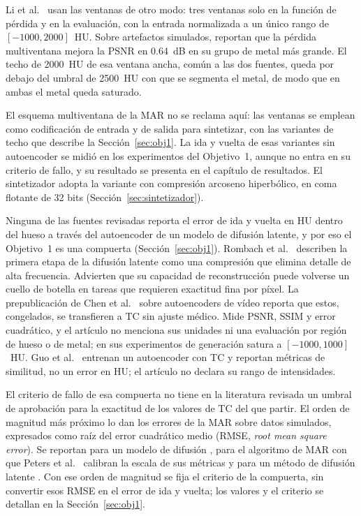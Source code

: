 Li et al.~\cite{li2024} usan las ventanas de otro modo: tres ventanas solo en la función de pérdida y en la evaluación, con la entrada normalizada a un único rango de $[-1000, 2000]$~HU. Sobre artefactos simulados, reportan que la pérdida multiventana mejora la PSNR en 0.64~dB en su grupo de metal más grande. El techo de 2000~HU de esa ventana ancha, común a las dos fuentes, queda por debajo del umbral de 2500~HU con que se segmenta el metal, de modo que en ambas el metal queda saturado.

El esquema multiventana de la MAR no se reclama aquí: las ventanas se emplean como codificación de entrada y de salida para sintetizar, con las variantes de techo que describe la Sección~\ref{sec:obj1}. La ida y vuelta de esas variantes sin autoencoder se midió en los experimentos del Objetivo~1, aunque no entra en su criterio de fallo, y su resultado se presenta en el capítulo de resultados. El sintetizador adopta la variante con compresión arcoseno hiperbólico, en coma flotante de 32 bits (Sección~\ref{sec:sintetizador}).

Ninguna de las fuentes revisadas reporta el error de ida y vuelta en HU dentro del hueso a través del autoencoder de un modelo de difusión latente, y por eso el Objetivo~1 es una compuerta (Sección~\ref{sec:obj1}). Rombach et al.~\cite{rombach2022latentdiffusion} describen la primera etapa de la difusión latente como una compresión que elimina detalle de alta frecuencia. Advierten que su capacidad de reconstrucción puede volverse un cuello de botella en tareas que requieren exactitud fina por píxel. La prepublicación de Chen et al.~\cite{chen2026foundationvae} sobre autoencoders de vídeo reporta que estos, congelados, se transfieren a TC sin ajuste médico. Mide PSNR, SSIM y error cuadrático, y el artículo no menciona sus unidades ni una evaluación por región de hueso o de metal; en sus experimentos de generación satura a $[-1000, 1000]$~HU. Guo et al.~\cite{guo2025maisi} entrenan un autoencoder con TC y reportan métricas de similitud, no un error en HU; el artículo no declara su rango de intensidades.

El criterio de fallo de esa compuerta no tiene en la literatura revisada un umbral de aprobación para la exactitud de los valores de TC del que partir. El orden de magnitud más próximo lo dan los errores de la MAR sobre datos simulados, expresados como raíz del error cuadrático medio (RMSE, \emph{root mean square error}). Se reportan para un modelo de difusión \cite{karageorgos2024ddpm}, para el algoritmo de MAR con que Peters et al.~\cite{peters2025hybrid} calibran la escala de sus métricas y para un método de difusión latente \cite{yun2026simulationdriven}. Con ese orden de magnitud se fija el criterio de la compuerta, sin convertir esos RMSE en el error de ida y vuelta; los valores y el criterio se detallan en la Sección~\ref{sec:obj1}.

